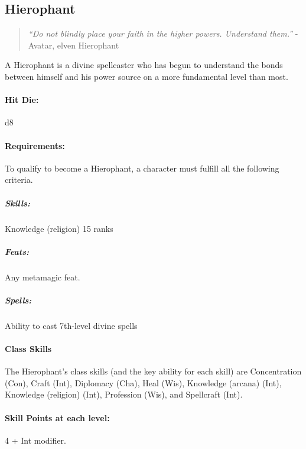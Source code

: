 \subsection{Hierophant}
\begin{quote}
\emph{``Do not blindly place your faith in the higher powers. Understand them.''}
- Avatar, elven Hierophant
\end{quote}
A Hierophant is a divine spellcaster who has begun to understand the bonds between himself and his power source on a more fundamental level than most.
\paragraph{Hit Die:} d8
\paragraph{Requirements:}
To qualify to become a Hierophant, a character must fulfill all the following criteria.
\subparagraph{Skills:} Knowledge (religion) 15 ranks 
\subparagraph{Feats:} Any metamagic feat.
\subparagraph{Spells:} Ability to cast 7th-level divine spells
\paragraph{Class Skills}
The Hierophant's class skills (and the key ability for each skill) are Concentration (Con), Craft (Int), Diplomacy (Cha), Heal (Wis), Knowledge (arcana) (Int), Knowledge (religion) (Int), Profession (Wis), and Spellcraft (Int).
\paragraph{Skill Points at each level:} 4 + Int modifier.
\begin{table*}
\centering
\caption{The Hierophant}
\label{tab:Hierophant}
\end{table*}
